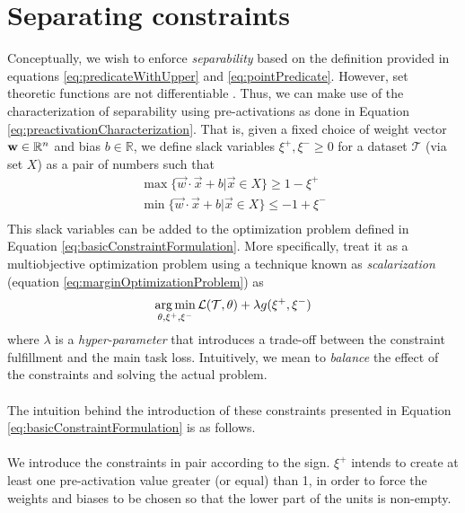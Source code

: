 \section{Separating constraints}\label{sec:constraint}
Conceptually, we wish to enforce \emph{separability} based on the definition provided in equations \ref{eq:predicateWithUpper} and \ref{eq:pointPredicate}. However, set theoretic functions are not differentiable \cite{Glorot10Initialization,lecun2015DeepLearningBig,munkres2000Topology}. Thus, we can make use of the characterization of separability using pre-activations as done in Equation \ref{eq:preactivationCharacterization}. That is, given a fixed choice of weight vector  $\mathbf{w}\in\mathbb{R}^{n}$ and bias $b\in\mathbb{R}$, we define slack variables $\xi^{+},\xi^{-}\geq 0$ for a dataset $\mathcal{T}$ (via set $X$) as a pair of numbers such that
\begin{equation}\label{eq:basicConstraintFormulation}
\begin{array}{lcl}
    \max\{\vec{w}\cdot\vec{x}+b|\vec{x}\in X\}\geq 1-\xi^{+}\\
    \min\{\vec{w}\cdot\vec{x}+b|\vec{x}\in X\}\leq -1+\xi^{-}\\
\end{array}
\end{equation}
This slack variables can be added to the optimization problem defined in Equation \ref{eq:basicConstraintFormulation}. More specifically, treat it as a multiobjective optimization problem using a technique known as \emph{scalarization} \cite{boyd} (equation \ref{eq:marginOptimizationProblem}) as
\begin{equation}\label{eq:marginOptimizationProblem}
\operatorname*{arg\,min}_{\theta,\xi^{+},\xi^{-}} \mathcal{L}(\mathcal{T},\theta) + \lambda g(\xi^{+},\xi^{-})
\end{equation}
where $\lambda$ is a \emph{hyper-parameter} that introduces a trade-off between the constraint fulfillment and the main task loss. Intuitively, we mean to \emph{balance} the effect of the constraints and solving the actual problem.
\\\\
The intuition behind the introduction of these constraints presented in Equation \ref{eq:basicConstraintFormulation} is as follows. 
\\\\
We introduce the constraints in pair according to the sign. $\xi^{+}$ intends to create at least one pre-activation value greater (or equal) than 1, in order to force the weights and biases to be chosen so that the lower part of the units is non-empty. 
